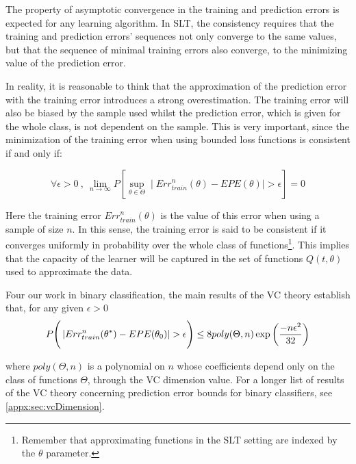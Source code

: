 The property of asymptotic convergence in the training and prediction errors is expected for any learning algorithm.
In SLT, the consistency requires that the training and prediction errors' sequences not only converge to the same values, but that the sequence of minimal training errors also converge, to the minimizing value of the prediction error.

In reality, it is reasonable to think that the approximation of the prediction error with the training error introduces a strong overestimation.
The training error will also be biased by the sample used whilst the prediction error, which is given for the whole class, is not dependent on the sample.
This is very important, since the minimization of the training error when using bounded loss functions is consistent if and only if:


\begin{equation}
\forall \epsilon > 0 \ , \ \lim_{n\to\infty} P\left[ \sup_{\theta \in \Theta} \mid Err^{n}_{train}(\theta) - EPE(\theta) \mid  > \epsilon  \right] = 0
\end{equation}

Here the training error $Err^{n}_{train}(\theta)$ is the value of this error when using a sample of size $n$.
In this sense, the training error is said to be consistent if it converges uniformly in probability over the whole class of functions\footnote{Remember that approximating functions in the SLT setting are indexed by the $\theta$ parameter.}.
This implies that the capacity of the learner will be captured in the set of functions $Q(t,\theta)$ used to approximate the data. 


	Four our work in binary classification, the main results of the VC theory establish that, for any given $\epsilon > 0$ 
\begin{equation}
P\Bigg(  \left|  Err^n_{train}(\theta^*) - EPE(\theta_0) \right| > \epsilon \Bigg)  \leq 8 poly(\Theta,n) \exp{\large \left( {\frac{-n\epsilon^2}{32}} \right)  } 
\end{equation}\label{eq:vapnik-binaryBoundProbability}

where $poly(\Theta,n)$ is a polynomial on $n$ whose coefficients depend only on the class of functions $\Theta$, through the VC dimension value. For a longer list of results of the VC theory concerning prediction error bounds for binary classifiers, see \cref{appx:sec:vcDimension}.

